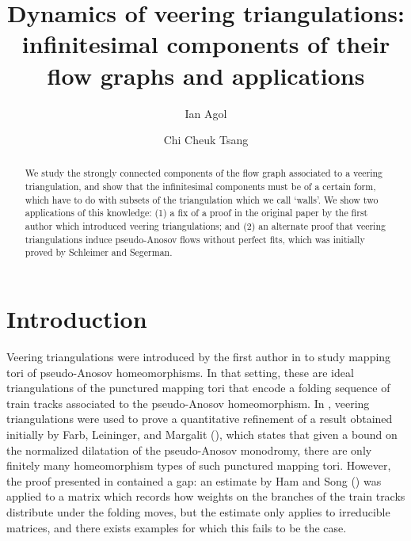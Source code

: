 \documentclass[12pt]{amsart}
\theoremstyle{definition}
\numberwithin{equation}{section}
\begin{document}
\title[Dynamics of veering triangulations]{Dynamics of veering triangulations: infinitesimal components of their flow graphs and applications}

\author{Ian Agol}
\address{University of California, Berkeley \\
    970 Evans Hall \#3840 \\
    Berkeley, CA 94720-3840}

\author{Chi Cheuk Tsang}
\address{University of California, Berkeley \\
    970 Evans Hall \#3840 \\
    Berkeley, CA 94720-3840}

\maketitle

\begin{abstract}

We study the strongly connected components of the flow graph associated to a veering triangulation, and show that the infinitesimal components must be of a certain form, which have to do with subsets of the triangulation which we call `walls'. We show two applications of this knowledge: (1) a fix of a proof in the original paper by the first author which introduced veering triangulations; and (2) an alternate proof that veering triangulations induce pseudo-Anosov flows without perfect fits, which was initially proved by Schleimer and Segerman. 

\end{abstract}


\section{Introduction} \label{sec:intro}
Veering triangulations were introduced by the first author in \cite{Ago11} to study mapping tori of pseudo-Anosov homeomorphisms. In that setting, these are ideal triangulations of the punctured mapping tori that encode a folding sequence of train tracks associated to the pseudo-Anosov homeomorphism. In \cite{Ago11}, veering triangulations were used to prove a quantitative refinement of a result obtained initially by Farb, Leininger, and Margalit (\cite{FLM11}), which states that given a bound on the normalized dilatation of the pseudo-Anosov monodromy, there are only finitely many homeomorphism types of such punctured mapping tori. However, the proof presented in \cite{Ago11} contained a gap: an estimate by Ham and Song (\cite{HS07}) was applied to a matrix which records how weights on the branches of the train tracks distribute under the folding moves, but the estimate only applies to irreducible matrices, and there exists examples for which this fails to be the case. 
\end{document}
